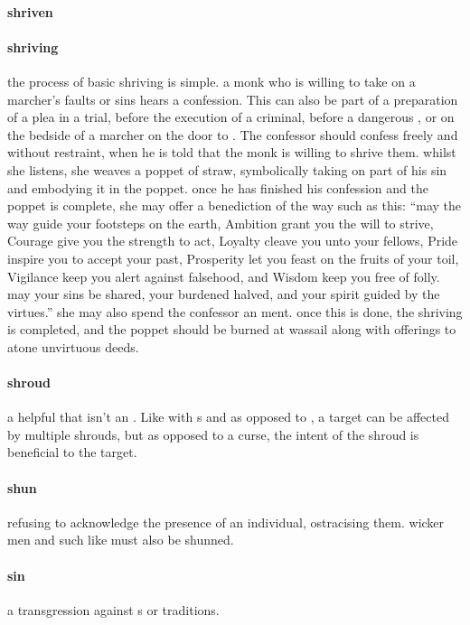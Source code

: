 \paragraph{shriven} 
\paragraph{shriving} the process of basic shriving is simple. a monk who is willing to take on a marcher’s faults or sins hears a confession. This can also be part of a preparation of a  plea in a trial, before the execution of a criminal, before a dangerous , or on the bedside of a marcher on the door to . The confessor should confess freely and without restraint, when he is told that the monk is willing to shrive them. whilst she listens, she weaves a poppet of straw, symbolically taking on part of his sin and embodying it in the poppet. once he has finished his confession and the poppet is complete, she may offer a benediction of the way such as this: “may the way guide your footsteps on the earth, Ambition grant you the will to strive, Courage give you the strength to act, Loyalty cleave you unto your fellows, Pride inspire you to accept your past, Prosperity let you feast on the fruits of your toil, Vigilance keep you alert against falsehood, and Wisdom keep you free of folly. may your sins be shared, your burdened halved, and your spirit guided by the virtues.” she may also spend the confessor an ment. once this is done, the shriving is completed, and the poppet should be burned at wassail along with offerings to atone unvirtuous deeds.
\paragraph{shroud} a helpful  that isn't an . Like with s and as opposed to , a target can be affected by multiple shrouds, but as opposed to a curse, the intent of the shroud is beneficial to the target.
\paragraph{shun} refusing to acknowledge the presence of an individual, ostracising them. wicker men and such like must also be shunned. 
\paragraph{sin} a transgression against s or traditions. 
